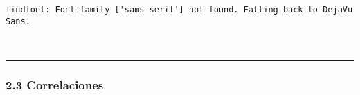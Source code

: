     \begin{Verbatim}[commandchars=\\\{\}]
findfont: Font family ['sams-serif'] not found. Falling back to DejaVu Sans.
    \end{Verbatim}

    \begin{center}
    \end{center}
    { \hspace*{\fill} \\}
    
    \begin{center}\rule{0.5\linewidth}{0.5pt}\end{center}

\hypertarget{correlaciones}{%
\subsubsection{2.3 Correlaciones}\label{correlaciones}}

